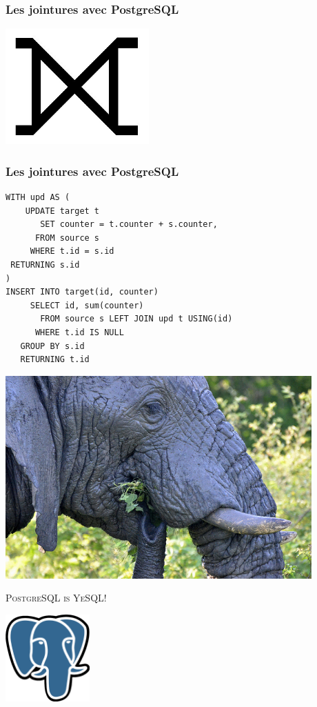 \documentclass{beamer}
\begin{document}
\begin{frame}
  \frametitle{Les jointures avec PostgreSQL}

  \begin{center}
    \includegraphics[height=12em]{huge-full-outer-join.jpg}
  \end{center}
\end{frame}

\begin{frame}[fragile]
  \frametitle{Les jointures avec PostgreSQL}

  \begin{verbatim}
WITH upd AS (
    UPDATE target t
       SET counter = t.counter + s.counter,
      FROM source s
     WHERE t.id = s.id
 RETURNING s.id
)
INSERT INTO target(id, counter)
     SELECT id, sum(counter)
       FROM source s LEFT JOIN upd t USING(id)
      WHERE t.id IS NULL
   GROUP BY s.id
   RETURNING t.id
  \end{verbatim}
\end{frame}

\begin{frame}
  \begin{center}
    \includegraphics[height=21em]{postgresql-mongodb.jpg}
  \end{center}
\end{frame}

\begin{frame}
  \begin{center}
    \textsc{\Huge PostgreSQL is YeSQL!}
    \vfill

    \includegraphics[height=9em]{postgres-logo.eps}
  \end{center}
\end{frame}
\end{document}
